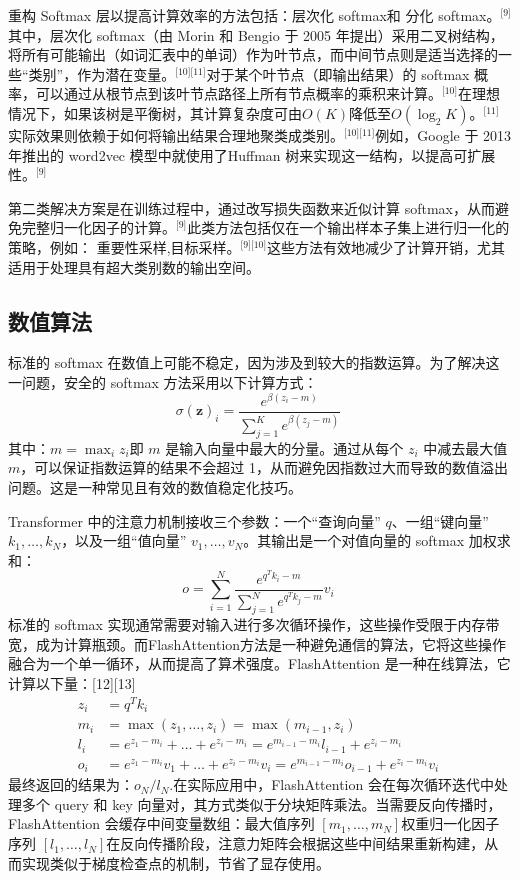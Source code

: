 重构 Softmax 层以提高计算效率的方法包括：层次化 softmax和 分化 softmax。\(^\text{[9]}\)其中，层次化 softmax（由 Morin 和 Bengio 于 2005 年提出）采用二叉树结构，将所有可能输出（如词汇表中的单词）作为叶节点，而中间节点则是适当选择的一些“类别”，作为潜在变量。\(^\text{[10][11]}\)对于某个叶节点（即输出结果）的 softmax 概率，可以通过从根节点到该叶节点路径上所有节点概率的乘积来计算。\(^\text{[10]}\)在理想情况下，如果该树是平衡树，其计算复杂度可由$O(K)$降低至$O(\log_2 K)$。\(^\text{[11]}\)实际效果则依赖于如何将输出结果合理地聚类成类别。\(^\text{[10][11]}\)例如，Google 于 2013 年推出的 word2vec 模型中就使用了Huffman 树来实现这一结构，以提高可扩展性。\(^\text{[9]}\)

第二类解决方案是在训练过程中，通过改写损失函数来近似计算 softmax，从而避免完整归一化因子的计算。\(^\text{[9]}\)此类方法包括仅在一个输出样本子集上进行归一化的策略，例如：  重要性采样,目标采样。\(^\text{[9][10]}\)这些方法有效地减少了计算开销，尤其适用于处理具有超大类别数的输出空间。
\subsection{数值算法}
标准的 softmax 在数值上可能不稳定，因为涉及到较大的指数运算。为了解决这一问题，安全的 softmax 方法采用以下计算方式：
$$
\sigma(\mathbf{z})_i = \frac{e^{\beta (z_i - m)}}{\sum_{j=1}^{K} e^{\beta (z_j - m)}}~
$$
其中：$m = \max_i z_i$即 $m$ 是输入向量中最大的分量。通过从每个 $z_i$ 中减去最大值 $m$，可以保证指数运算的结果不会超过 1，从而避免因指数过大而导致的数值溢出问题。这是一种常见且有效的数值稳定化技巧。

Transformer 中的注意力机制接收三个参数：一个“查询向量” $q$、一组“键向量” $k_1, \dots, k_N$，以及一组“值向量” $v_1, \dots, v_N$。其输出是一个对值向量的 softmax 加权求和：
$$
o = \sum_{i=1}^{N} \frac{e^{q^{T}k_i - m}}{\sum_{j=1}^{N} e^{q^{T}k_j - m}} v_i~
$$
标准的 softmax 实现通常需要对输入进行多次循环操作，这些操作受限于内存带宽，成为计算瓶颈。而FlashAttention方法是一种避免通信的算法，它将这些操作融合为一个单一循环，从而提高了算术强度。FlashAttention 是一种在线算法，它计算以下量：[12][13]
$$
\begin{aligned}
z_i &= q^T k_i \\
m_i &= \max(z_1, \dots, z_i) = \max(m_{i-1}, z_i) \\
l_i &= e^{z_1 - m_i} + \dots + e^{z_i - m_i} = e^{m_{i-1} - m_i} l_{i-1} + e^{z_i - m_i} \\
o_i &= e^{z_1 - m_i} v_1 + \dots + e^{z_i - m_i} v_i = e^{m_{i-1} - m_i} o_{i-1} + e^{z_i - m_i} v_i
\end{aligned}~
$$
最终返回的结果为：$o_N/l_N$.在实际应用中，FlashAttention 会在每次循环迭代中处理多个 query 和 key 向量对，其方式类似于分块矩阵乘法。当需要反向传播时，FlashAttention 会缓存中间变量数组：最大值序列 $[m_1, \dots, m_N]$权重归一化因子序列 $[l_1, \dots, l_N]$在反向传播阶段，注意力矩阵会根据这些中间结果重新构建，从而实现类似于梯度检查点的机制，节省了显存使用。
